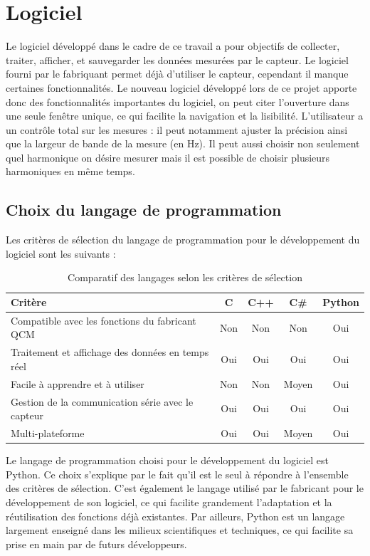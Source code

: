 \chapter{Logiciel}
Le logiciel développé dans le cadre de ce travail a pour objectifs de collecter, traiter, afficher, et sauvegarder les données mesurées par le capteur.
Le logiciel fourni par le fabriquant permet déjà d'utiliser le capteur, cependant il manque certaines fonctionnalités. Le nouveau logiciel développé lors de ce projet apporte donc des fonctionnalités importantes du logiciel, on peut citer l’ouverture dans une seule fenêtre unique, ce qui facilite la navigation et la lisibilité.
L'utilisateur a un contrôle total sur les mesures : il peut notamment ajuster la précision ainsi que la largeur de bande de la mesure (en Hz).
Il peut aussi choisir non seulement quel harmonique on désire mesurer mais il est possible de choisir plusieurs harmoniques en même temps.

\section{Choix du langage de programmation}

Les critères de sélection du langage de programmation pour le développement du logiciel sont les suivants :

\begin{table}[H]
    \centering
    \begin{tabular}{|p{6cm}|c|c|c|c|}
        \hline
        \textbf{Critère} & \textbf{C} & \textbf{C++} & \textbf{C\#} & \textbf{Python} \\
        \hline
        Compatible avec les fonctions du fabricant QCM & Non & Non & Non & Oui \\
        \hline
        Traitement et affichage des données en temps réel & Oui & Oui & Oui & Oui \\
        \hline
        Facile à apprendre et à utiliser & Non & Non & Moyen & Oui \\
        \hline
        Gestion de la communication série avec le capteur & Oui & Oui & Oui & Oui \\
        \hline
        Multi-plateforme & Oui & Oui & Moyen & Oui \\
        \hline
    \end{tabular}
    \caption{Comparatif des langages selon les critères de sélection}
    \label{tab:comparatif_langages}
\end{table}

Le langage de programmation choisi pour le développement du logiciel est Python.  
Ce choix s’explique par le fait qu’il est le seul à répondre à l’ensemble des critères de sélection. C’est également le langage utilisé par le fabricant pour le développement de son logiciel, ce qui facilite grandement l’adaptation et la réutilisation des fonctions déjà existantes.  
Par ailleurs, Python est un langage largement enseigné dans les milieux scientifiques et techniques, ce qui facilite sa prise en main par de futurs développeurs.


